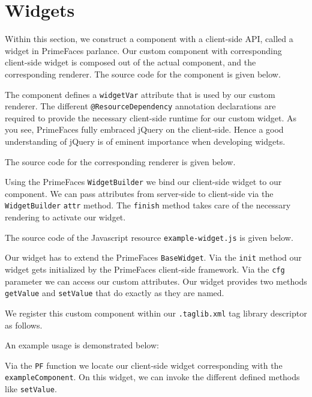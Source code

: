 \section{Widgets}
Within this section, we construct a component with a client-side API, called a widget in PrimeFaces parlance.
Our custom component with corresponding client-side widget is composed out of the actual component, and the corresponding renderer.
The source code for the component is given below.

The component defines a \texttt{widgetVar} attribute that is used by our custom renderer.
The different \texttt{@ResourceDependency} annotation declarations are required to provide the necessary client-side runtime for our custom widget.
As you see, PrimeFaces fully embraced jQuery \cite{jQuery} on the client-side.
Hence a good understanding of jQuery is of eminent importance when developing widgets.

The source code for the corresponding renderer is given below.

Using the PrimeFaces \texttt{WidgetBuilder} we bind our client-side widget to our component.
We can pass attributes from server-side to client-side via the \texttt{WidgetBuilder} \texttt{attr} method.
The \texttt{finish} method takes care of the necessary rendering to activate our widget.

The source code of the Javascript resource \texttt{example-widget.js} is given below.

Our widget has to extend the PrimeFaces \texttt{BaseWidget}.
Via the \texttt{init} method our widget gets initialized by the PrimeFaces client-side framework.
Via the \texttt{cfg} parameter we can access our custom attributes.
Our widget provides two methods \texttt{getValue} and \texttt{setValue} that do exactly as they are named.

We register this custom component within our \texttt{.taglib.xml} tag library descriptor as follows.


An example usage is demonstrated below:

Via the \texttt{PF} function we locate our client-side widget corresponding with the \texttt{exampleComponent}.
On this widget, we can invoke the different defined methods like \texttt{setValue}.

